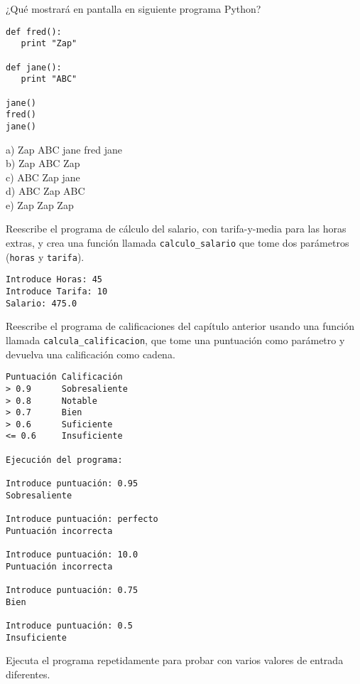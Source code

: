 \begin{ex}
¿Qué mostrará en pantalla en siguiente programa Python?

\beforeverb
\begin{verbatim}
def fred():
   print "Zap"

def jane():
   print "ABC"

jane()
fred()
jane()
\end{verbatim}
\afterverb
%
a) Zap ABC jane fred jane\\
b) Zap ABC Zap\\
c) ABC Zap jane\\
d) ABC Zap ABC\\
e) Zap Zap Zap
\end{ex}

\begin{ex}
Reescribe el programa de cálculo del salario, con tarifa-y-media para las horas extras,
y crea una función llamada {\tt calculo_salario} que tome
dos parámetros ({\tt horas} y {\tt tarifa}).

\begin{verbatim}
Introduce Horas: 45
Introduce Tarifa: 10
Salario: 475.0
\end{verbatim}
\end{ex}

\begin{ex}
Reescribe el programa de calificaciones del capítulo anterior
usando una función llamada {\tt calcula_calificacion}, que tome
una puntuación como parámetro y devuelva una calificación como cadena.

\begin{verbatim}
Puntuación Calificación
> 0.9      Sobresaliente
> 0.8      Notable
> 0.7      Bien
> 0.6      Suficiente
<= 0.6     Insuficiente

Ejecución del programa:

Introduce puntuación: 0.95
Sobresaliente

Introduce puntuación: perfecto
Puntuación incorrecta

Introduce puntuación: 10.0
Puntuación incorrecta

Introduce puntuación: 0.75
Bien

Introduce puntuación: 0.5
Insuficiente
\end{verbatim}

Ejecuta el programa repetidamente para probar con varios valores
de entrada diferentes.
\end{ex}